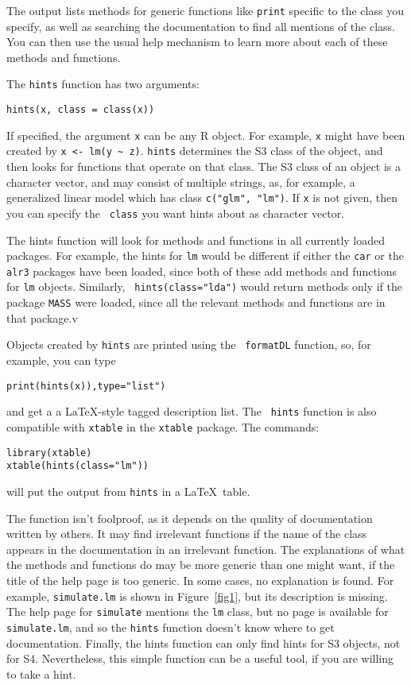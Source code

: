 \documentclass{report}
\begin{document}
\begin{article}
The output lists methods for generic functions like {\tt print} specific to
the class you specify, as well as searching the documentation to find all
mentions of the class. You can then use the usual help mechanism to learn more
about each of these methods and functions.

The {\tt hints} function has two arguments:

\begin{verbatim}
hints(x, class = class(x))
\end{verbatim}
If specified, the argument {\tt x} can be any R object. For example, {\tt x}
might have been created by \verb|x <- lm(y ~ z)|. {\tt hints} determines the
S3 class of the object, and then looks for functions that operate on that
class. The S3 class of an object is a character vector, and may consist of
multiple strings, as, for example, a generalized linear model which has class
{\tt c("glm", "lm")}. If {\tt x} is not given, then you can specify the {\tt
class} you want hints about as character vector.

The hints function will look for methods and functions in all currently loaded
packages. For example, the hints for {\tt lm} would be different if either the
{\tt car} or the {\tt alr3} packages have been loaded, since both of these add
methods and functions for {\tt lm} objects. Similarly, {\tt
hints(class="lda")} would return methods only if the package {\tt MASS} were
loaded, since all the relevant methods and functions are in that package.v

Objects created by {\tt hints} are printed using the {\tt 
formatDL} function, so, for example, you can type
\begin{verbatim}
print(hints(x)),type="list")
\end{verbatim}
and get a a \LaTeX-style tagged description list. The {\tt
hints} function is also compatible with {\tt xtable} in the
{\tt xtable} package. The commands:

\begin{verbatim}
library(xtable)
xtable(hints(class="lm"))
\end{verbatim}

\noindent will put the output from {\tt hints} in a \LaTeX\ table.

The function isn't foolproof, as it depends on the quality of documentation
written by others. It may find irrelevant functions if the name of the class
appears in the documentation in an irrelevant function. The explanations of
what the methods and functions do may be more generic than one might want, if
the title of the help page is too generic. In some cases, no explanation is
found. For example, {\tt simulate.lm} is shown in Figure~\ref{fig1}, but its
description is missing. The help page for {\tt simulate} mentions the {\tt lm}
class, but no page is available for {\tt simulate.lm}, and so the {\tt hints}
function doesn't know where to get documentation. Finally, the hints function
can only find hints for S3 objects, not for S4. Nevertheless, this simple
function can be a useful tool, if you are willing to take a hint.


\end{article}
\end{document}
